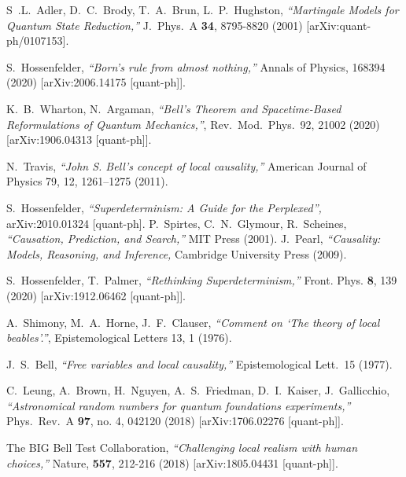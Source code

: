 \documentclass[12pt]{article}
\begin{document}
\begin{thebibliography}{99}
{
S~.L.~Adler, D.~C.~Brody, T.~A.~Brun, L.~P.~Hughston, {\sl ``Martingale Models for Quantum State Reduction,''} J.\ Phys.\ A {\bf 34}, 8795-8820 (2001) [arXiv:quant-ph/0107153].
 
S.~Hossenfelder,
{\sl ``Born's rule from almost nothing,''} Annals of Physics, 168394 (2020)
[arXiv:2006.14175 [quant-ph]].

    K.~B.~Wharton, N.~Argaman, {\sl ``Bell's Theorem and Spacetime-Based Reformulations of Quantum Mechanics,''}, Rev.\ Mod.\ Phys.\ 92, 21002 (2020) [arXiv:1906.04313 [quant-ph]].

 N.~Travis,  {\sl ``John S. Bell’s concept of local causality,''} American Journal of Physics 79, 12, 1261--1275 (2011).



S.~Hossenfelder, {\sl ``Superdeterminism: A Guide for the Perplexed'',} arXiv:2010.01324 [quant-ph].
 P.~Spirtes, C.~N.~Glymour, R.~Scheines, {\sl ``Causation, Prediction, and Search,''} MIT Press (2001).
  J.~Pearl, {\sl ``Causality: Models, Reasoning, and Inference,} Cambridge University Press (2009).

S.~Hossenfelder, T.~Palmer,
{\sl ``Rethinking Superdeterminism,''}
Front. Phys. \textbf{8}, 139 (2020)
[arXiv:1912.06462 [quant-ph]].

 
A.~Shimony, M.~A.~Horne, J.~F.~Clauser, {\sl ``Comment on ‘The theory of
local beables’.''}, Epistemological Letters 13, 1 (1976). 

 J.~S.~Bell, {\sl ``Free variables and local causality,''} Epistemological Lett.\ 15 (1977). 
 
 
 
  C.~Leung, A.~Brown, H.~Nguyen, A.~S.~Friedman, D.~I.~Kaiser, J.~Gallicchio,
  {\sl ``Astronomical random numbers for quantum foundations experiments,''}
  Phys.\ Rev.\ A {\bf 97}, no. 4, 042120 (2018)
  [arXiv:1706.02276 [quant-ph]].
  
     The {\sc BIG} Bell Test Collaboration, {\sl ``Challenging local realism with human choices,''} Nature, {\bf 557}, 212-216 (2018) [arXiv:1805.04431 [quant-ph]].
  
}
\end{thebibliography}
\end{document}
